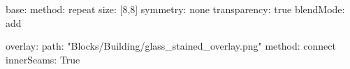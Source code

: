 base:
  method: repeat
  size: [8,8]
  symmetry: none
  transparency: true
blendMode: add
  
overlay:
  path: "Blocks/Building/glass_stained_overlay.png"
  method: connect
  innerSeams: True
